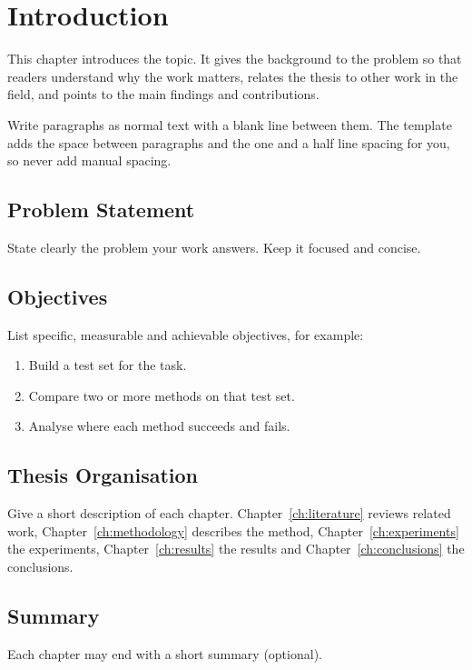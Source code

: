 \chapter{Introduction}
\label{ch:introduction}

This chapter introduces the topic. It gives the background to the problem so that readers
understand why the work matters, relates the thesis to other work in the field, and points
to the main findings and contributions.

Write paragraphs as normal text with a blank line between them. The template adds the space
between paragraphs and the one and a half line spacing for you, so never add manual spacing.

\section{Problem Statement}
State clearly the problem your work answers. Keep it focused and concise.

\section{Objectives}
List specific, measurable and achievable objectives, for example:
\begin{enumerate}
  \item Build a test set for the task.
  \item Compare two or more methods on that test set.
  \item Analyse where each method succeeds and fails.
\end{enumerate}

\section{Thesis Organisation}
Give a short description of each chapter. Chapter~\ref{ch:literature} reviews related work,
Chapter~\ref{ch:methodology} describes the method, Chapter~\ref{ch:experiments} the
experiments, Chapter~\ref{ch:results} the results and Chapter~\ref{ch:conclusions} the
conclusions.

\section{Summary}
Each chapter may end with a short summary (optional).
